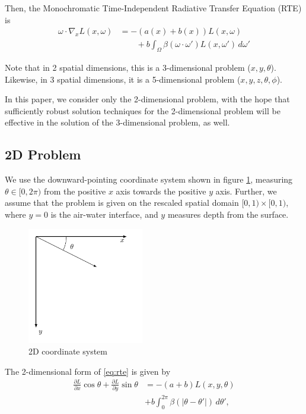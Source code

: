 \documentclass[10pt]{article}
\newcommand\abs[1]{\left| #1 \right|}
\newcommand\pd[2]{\frac{\partial #1}{\partial #2}}
\begin{document}
\begin{multicols}{2}
Then, the Monochromatic Time-Independent Radiative Transfer Equation (RTE) is
\begin{equation}
	\tag{RTE}
	\label{eq:rte}
	\begin{aligned}
		\omega \cdot \nabla_x L(x,\omega) &= -(a(x) + b(x)) L(x,\omega) \\
		&\qquad + b \int_\Omega \beta(\omega \cdot \omega') L(x,\omega')\, d\omega'
	\end{aligned}
\end{equation}

Note that in 2 spatial dimensions, this is a 3-dimensional problem ($x,y,\theta$).
Likewise, in 3 spatial dimensions, it is a 5-dimensional problem ($x,y,z,\theta,\phi$).

In this paper, we consider only the 2-dimensional problem, with the hope that sufficiently robust solution techniques for the 2-dimensional problem will be effective in the solution of the 3-dimensional problem, as well.

\subsection{2D Problem}
\label{sec:2d}
We use the downward-pointing coordinate system shown in figure \ref{fig:coords}, measuring $\theta \in [0,2\pi)$ from the positive $x$ axis towards the positive $y$ axis.
Further, we assume that the problem is given on the rescaled spatial domain $[0,1) \times [0,1)$, where $y=0$ is the air-water interface, and $y$ measures depth from the surface.

\begin{figure}[H]
	\centering
	\includegraphics[width=2in]{2d_coords}
	\caption{2D coordinate system}
	\label{fig:coords}
\end{figure}

The 2-dimensional form of \eqref{eq:rte} is given by
\begin{equation}
	\begin{aligned}
		\pd{L}{x} \cos\theta + \pd{L}{y} \sin\theta
		&= -(a+b)L(x,y,\theta) \\
		&+ b\int_0^{2\pi} \beta(\abs{\theta-\theta'})\,d\theta',
	\end{aligned}
	\label{eq:rte2d}
\end{equation}


\end{multicols}
\end{document}
